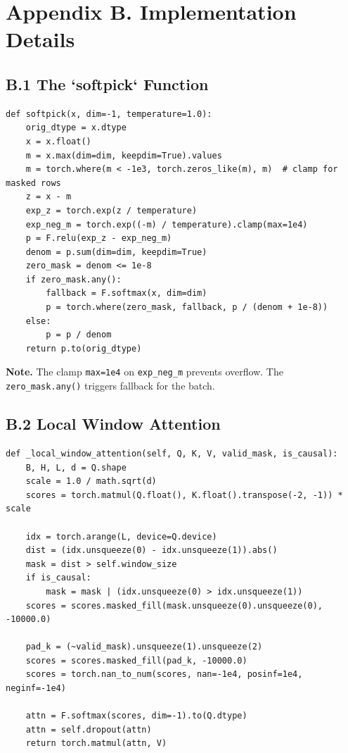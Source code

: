 
\section{Appendix B. Implementation Details}

\subsection{B.1 The `softpick` Function}

\begin{lstlisting}
def softpick(x, dim=-1, temperature=1.0):
    orig_dtype = x.dtype
    x = x.float()
    m = x.max(dim=dim, keepdim=True).values
    m = torch.where(m < -1e3, torch.zeros_like(m), m)  # clamp for masked rows
    z = x - m
    exp_z = torch.exp(z / temperature)
    exp_neg_m = torch.exp((-m) / temperature).clamp(max=1e4)
    p = F.relu(exp_z - exp_neg_m)
    denom = p.sum(dim=dim, keepdim=True)
    zero_mask = denom <= 1e-8
    if zero_mask.any():
        fallback = F.softmax(x, dim=dim)
        p = torch.where(zero_mask, fallback, p / (denom + 1e-8))
    else:
        p = p / denom
    return p.to(orig_dtype)
\end{lstlisting}

\textbf{Note.} The clamp \texttt{max=1e4} on \texttt{exp\_neg\_m} prevents overflow. The 
\texttt{zero\_mask.any()} triggers fallback for the batch.

\subsection{B.2 Local Window Attention}

\begin{lstlisting}
def _local_window_attention(self, Q, K, V, valid_mask, is_causal):
    B, H, L, d = Q.shape
    scale = 1.0 / math.sqrt(d)
    scores = torch.matmul(Q.float(), K.float().transpose(-2, -1)) * scale
    
    idx = torch.arange(L, device=Q.device)
    dist = (idx.unsqueeze(0) - idx.unsqueeze(1)).abs()
    mask = dist > self.window_size
    if is_causal:
        mask = mask | (idx.unsqueeze(0) > idx.unsqueeze(1))
    scores = scores.masked_fill(mask.unsqueeze(0).unsqueeze(0), -10000.0)
    
    pad_k = (~valid_mask).unsqueeze(1).unsqueeze(2)
    scores = scores.masked_fill(pad_k, -10000.0)
    scores = torch.nan_to_num(scores, nan=-1e4, posinf=1e4, neginf=-1e4)
    
    attn = F.softmax(scores, dim=-1).to(Q.dtype)
    attn = self.dropout(attn)
    return torch.matmul(attn, V)
\end{lstlisting}

